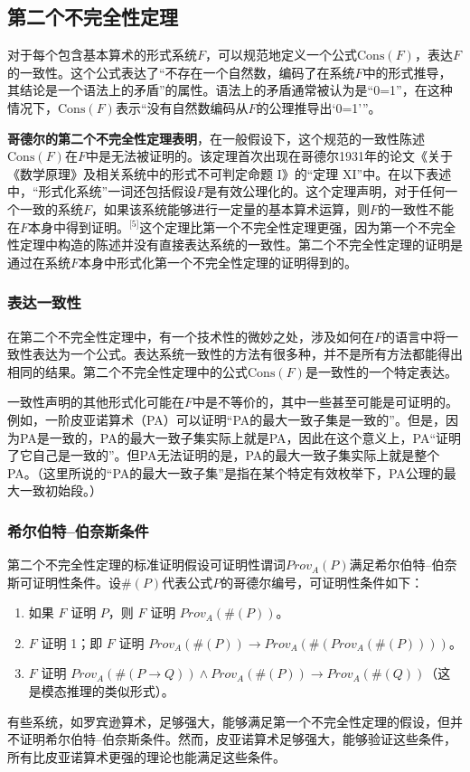 \subsection{第二个不完全性定理}
对于每个包含基本算术的形式系统\( F \)，可以规范地定义一个公式\( \text{Cons}(F) \)，表达\( F \)的一致性。这个公式表达了“不存在一个自然数，编码了在系统\( F \)中的形式推导，其结论是一个语法上的矛盾”的属性。语法上的矛盾通常被认为是“0=1”，在这种情况下，\( \text{Cons}(F) \)表示“没有自然数编码从\( F \)的公理推导出‘0=1’”。

\textbf{哥德尔的第二个不完全性定理表明}，在一般假设下，这个规范的一致性陈述\( \text{Cons}(F) \)在\( F \)中是无法被证明的。该定理首次出现在哥德尔1931年的论文《关于《数学原理》及相关系统中的形式不可判定命题 I》的“定理 XI”中。在以下表述中，“形式化系统”一词还包括假设\( F \)是有效公理化的。这个定理声明，对于任何一个一致的系统\( F \)，如果该系统能够进行一定量的基本算术运算，则\( F \)的一致性不能在\( F \)本身中得到证明。\(^\text{[5]}\)这个定理比第一个不完全性定理更强，因为第一个不完全性定理中构造的陈述并没有直接表达系统的一致性。第二个不完全性定理的证明是通过在系统\( F \)本身中形式化第一个不完全性定理的证明得到的。
\subsubsection{表达一致性} 
在第二个不完全性定理中，有一个技术性的微妙之处，涉及如何在\( F \)的语言中将一致性表达为一个公式。表达系统一致性的方法有很多种，并不是所有方法都能得出相同的结果。第二个不完全性定理中的公式\( \text{Cons}(F) \)是一致性的一个特定表达。

一致性声明的其他形式化可能在\( F \)中是不等价的，其中一些甚至可能是可证明的。例如，一阶皮亚诺算术（PA）可以证明“PA的最大一致子集是一致的”。但是，因为PA是一致的，PA的最大一致子集实际上就是PA，因此在这个意义上，PA“证明了它自己是一致的”。但PA无法证明的是，PA的最大一致子集实际上就是整个PA。（这里所说的“PA的最大一致子集”是指在某个特定有效枚举下，PA公理的最大一致初始段。）
\subsubsection{希尔伯特–伯奈斯条件}  
第二个不完全性定理的标准证明假设可证明性谓词\( Prov_{A}(P) \)满足希尔伯特–伯奈斯可证明性条件。设\( \#(P) \)代表公式\( P \)的哥德尔编号，可证明性条件如下：
\begin{enumerate}
\item 如果 \( F \) 证明 \( P \)，则 \( F \) 证明 \( Prov_A(\#(P)) \)。
\item \( F \) 证明 1；即 \( F \) 证明 \( Prov_A(\#(P)) \rightarrow Prov_A(\#(Prov_A(\#(P)))) \)。
\item \( F \) 证明 \( Prov_A(\#(P \rightarrow Q)) \land Prov_A(\#(P)) \rightarrow Prov_A(\#(Q)) \)（这是模态推理的类似形式）。
\end{enumerate}
有些系统，如罗宾逊算术，足够强大，能够满足第一个不完全性定理的假设，但并不证明希尔伯特–伯奈斯条件。然而，皮亚诺算术足够强大，能够验证这些条件，所有比皮亚诺算术更强的理论也能满足这些条件。
